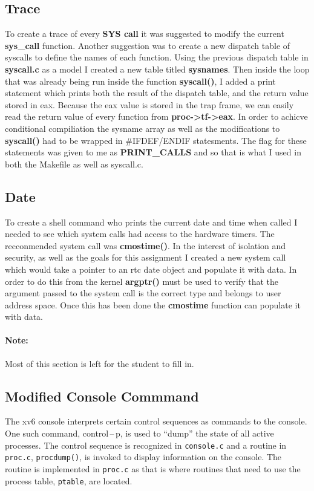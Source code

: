 \documentclass[12pt,letterpaper]{report}
\begin{document}
	    \subsection*{Trace}
             To create a trace of every \textbf{SYS call} it was suggested to modify the current \textbf{sys\_call} function. 
             Another suggestion was to create a new dispatch table of syscalls to define the names of each function. Using the
             previous dispatch table in \textbf{syscall.c} as a model I created a new table titled \textbf{sysnames}. Then 
             inside the loop that was already being run inside the function \textbf{syscall()}, I added a print statement which
             prints both the result of the dispatch table, and the return value stored in eax. Because the eax value is 
             stored in the trap frame, we can easily read the return value of every function from \textbf{proc->tf->eax}.
             \n
             In order to achicve conditional compiliation the sysname array as well as the modifications to \textbf{syscall()}
             had to be wrapped in #IFDEF/ENDIF statesments. The flag for these statements was given to me as 
             \textbf{PRINT\_CALLS} and so that is what I used in both the Makefile as well as syscall.c.
             \subsection*{Date}
             To create a shell command who prints the current date and time when called I needed to see which system calls had 
             access to the hardware timers. The recconmended system call was \textbf{cmostime()}. In the interest of 
             isolation and security, as well as the goals for this assignment I created a new system call which would take 
             a pointer to an rtc date object and populate it with data. In order to do this from the kernel \textbf{argptr()}
             must be used to verify that the argument passed to the system call is the correct type and belongs to user
             address space. Once this has been done the \textbf{cmostime} function can populate it with data.
	\paragraph{Note:}Most of this section is left for the student to fill in.
	
	\subsection*{Modified Console Commmand}
	The xv6 console interprets certain control sequences as commands to the console. One such command, control\,--\,p, is used to ``dump'' the state of all active processes. The control sequence is recognized in \texttt{console.c} and a routine in \texttt{proc.c}, \texttt{procdump()}, is invoked to display information on the console. The routine is implemented in \texttt{proc.c} as that is where  routines that need to use the process table, \texttt{ptable}, are located.
	
\end{document}
